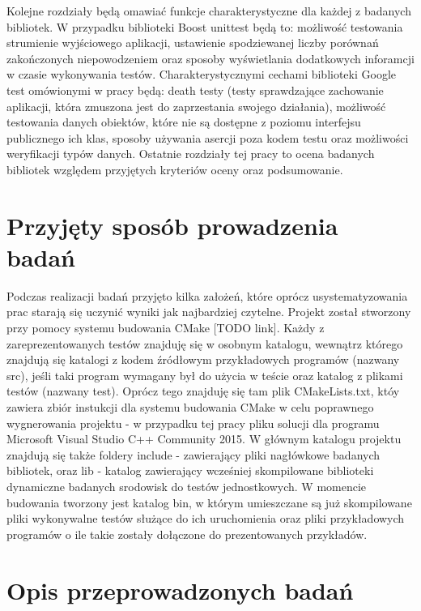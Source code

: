 \documentclass[12pt,a4paper,notitlepage]{report}
\begin{document}
Kolejne rozdziały będą omawiać funkcje charakterystyczne dla każdej z badanych bibliotek.
W przypadku biblioteki Boost unittest będą to: możliwość testowania strumienie wyjściowego aplikacji, ustawienie spodziewanej liczby porównań zakończonych niepowodzeniem oraz sposoby wyświetlania dodatkowych inforamcji w czasie wykonywania testów.
Charakterystycznymi cechami biblioteki Google test omówionymi w pracy będą: death testy (testy sprawdzające zachowanie aplikacji, która zmuszona jest do zaprzestania swojego działania), możliwość testowania danych obiektów, które nie są dostępne z poziomu interfejsu publicznego ich klas, sposoby używania asercji poza kodem testu oraz możliwości weryfikacji typów danych.
Ostatnie rozdziały tej pracy to ocena badanych bibliotek względem przyjętych kryteriów oceny oraz podsumowanie.

\chapter{Przyjęty sposób prowadzenia badań}

Podczas realizacji badań przyjęto kilka założeń, które oprócz usystematyzowania prac starają się uczynić wyniki jak najbardziej czytelne.
Projekt został stworzony przy pomocy systemu budowania CMake [TODO link].
Każdy z zareprezentowanych testów znajduję się w osobnym katalogu, wewnątrz którego znajdują się katalogi z kodem źródłowym przykładowych programów (nazwany src), jeśli taki program wymagany był do użycia w teście oraz katalog z plikami testów (nazwany test). Oprócz tego znajduję się tam plik CMakeLists.txt, któy zawiera zbiór instukcji dla systemu budowania CMake w celu poprawnego wygnerowania projektu - w przypadku tej pracy pliku solucji dla programu Microsoft Visual Studio C++ Community 2015.
W głównym katalogu projektu znajdują się także foldery include - zawierający pliki nagłówkowe badanych bibliotek, oraz lib - katalog zawierający wcześniej skompilowane biblioteki dynamiczne badanych srodowisk do testów jednostkowych.
W momencie budowania tworzony jest katalog bin, w którym umieszczane są już skompilowane pliki wykonywalne testów służące do ich uruchomienia oraz pliki przykładowych programów o ile takie zostały dołączone do prezentowanych przykładów.

\chapter{Opis przeprowadzonych badań}
\end{document}
